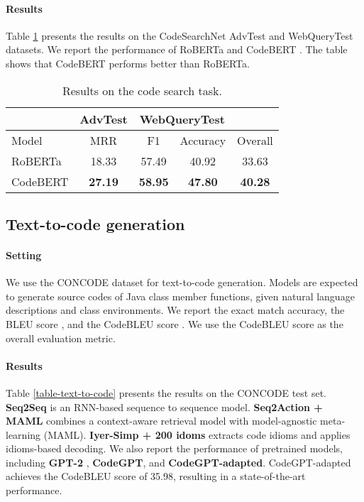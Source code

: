 \documentclass[sigconf,nonacm,screen]{acmart}
\begin{document}
\paragraph{Results} Table \ref{table-code-search-results} presents the results on the CodeSearchNet AdvTest and WebQueryTest datasets. We report the performance of RoBERTa \cite{liu2019roberta} and CodeBERT \cite{feng2020codebert}. The table shows that CodeBERT performs better than RoBERTa.

\begin{table}[h]
\centering
\caption{Results on the code search task.}
\label{table-code-search-results}
\begin{tabular}{lcccc}
\toprule
    & AdvTest & \multicolumn{2}{c}{WebQueryTest}& \\
    \midrule
     Model & MRR &  F1 & Accuracy & Overall \\
    \midrule 
	RoBERTa& 18.33 &  57.49 & 40.92 & 33.63 \\
	CodeBERT& \bf{27.19} & \bf{58.95} & \bf{47.80} & \bf{40.28} \\
	\bottomrule
\end{tabular}
\end{table}

\subsection{Text-to-code generation}
\paragraph{Setting}
We use the CONCODE dataset for text-to-code generation. Models are expected to generate source codes of Java class member functions, given natural language descriptions and class environments. We report the exact match accuracy, the BLEU score \cite{papineni2002bleu}, and the CodeBLEU score \cite{ren2020codebleu}. We use the CodeBLEU score as the overall evaluation metric.

\paragraph{Results}
Table \ref{table-text-to-code} presents the results on the CONCODE test set. \textbf{Seq2Seq} \cite{sutskever2014sequence} is an RNN-based sequence to sequence model. \textbf{Seq2Action + MAML} \cite{guo2019coupling} combines a context-aware retrieval model with model-agnostic meta-learning (MAML). \textbf{Iyer-Simp + 200 idoms} \cite{iyer2019learning} extracts code idioms and applies idioms-based decoding. We also report the performance of pretrained models, including \textbf{GPT-2} \cite{radford2019language}, \textbf{CodeGPT}, and \textbf{CodeGPT-adapted}. CodeGPT-adapted achieves the CodeBLEU score of 35.98, resulting in a state-of-the-art performance.
\end{document}
